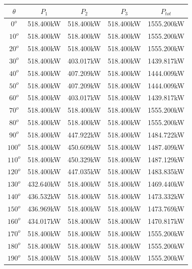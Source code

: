 	\singlespacing
	\begin{table}[H]
	    \centering
	    \begin{tabular}{|c|c|c|c|c|}
	   \hline
	         $\theta$ & $P_{1}$ & $P_{2}$ & $P_{3}$ & $P_{tot}$ \\
	     \hline
	     $0^{o}$ & 518.400kW & 518.400kW & 518.400kW & 1555.200kW \\
	     \hline
	     $10^{o}$ & 518.400kW & 518.400kW & 518.400kW & 1555.200kW \\
	     \hline
	     $20^{o}$ & 518.400kW & 518.400kW & 518.400kW & 1555.200kW \\
	     \hline
	     $30^{o}$ & 518.400kW & 403.017kW & 518.400kW & 1439.817kW \\
	     \hline
	     $40^{o}$ & 518.400kW & 407.209kW & 518.400kW & 1444.009kW \\
	     \hline
	     $50^{o}$ & 518.400kW & 407.209kW & 518.400kW & 1444.009kW \\
	     \hline
	     $60^{o}$ & 518.400kW & 403.017kW & 518.400kW & 1439.817kW \\
	     \hline
	     $70^{o}$ & 518.400kW & 518.400kW & 518.400kW & 1555.200kW \\
	     \hline
	     $80^{o}$ & 518.400kW & 518.400kW & 518.400kW & 1555.200kW \\
	     \hline
	     $90^{o}$ & 518.400kW & 447.922kW & 518.400kW & 1484.722kW \\
	     \hline
	     $100^{o}$ & 518.400kW & 450.609kW & 518.400kW & 1487.409kW \\
	     \hline
	     $110^{o}$ & 518.400kW & 450.329kW & 518.400kW & 1487.129kW \\
	     \hline
	     $120^{o}$ & 518.400kW & 447.035kW & 518.400kW & 1483.835kW \\
	     \hline
	     $130^{o}$ & 432.640kW & 518.400kW & 518.400kW & 1469.440kW \\
	     \hline
	     $140^{o}$ & 436.532kW & 518.400kW & 518.400kW & 1473.332kW \\
	     \hline
	     $150^{o}$ & 436.969kW & 518.400kW & 518.400kW & 1473.769kW \\
	     \hline
	     $160^{o}$ & 434.017kW & 518.400kW & 518.400kW & 1470.817kW \\
	     \hline
	     $170^{o}$ & 518.400kW & 518.400kW & 518.400kW & 1555.200kW \\
	     \hline
	     $180^{o}$ & 518.400kW & 518.400kW & 518.400kW & 1555.200kW \\
	     \hline
	     $190^{o}$ & 518.400kW & 518.400kW & 518.400kW & 1555.200kW \\

\end{tabular}
\end{table}
